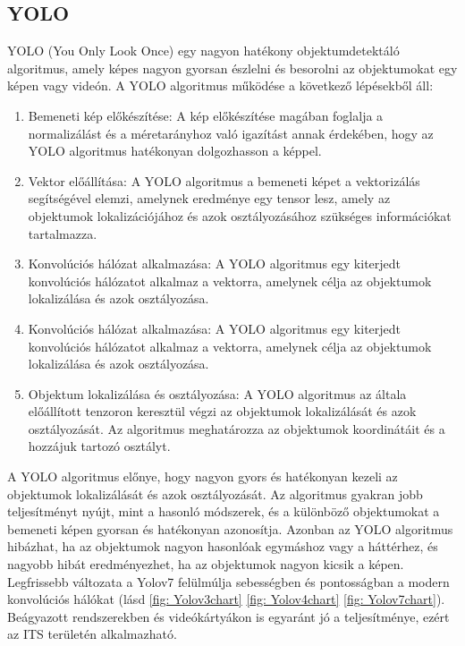 \documentclass[acmtog, authorversion]{acmart}
\begin{document}
\subsection{YOLO}
YOLO (You Only Look Once) egy nagyon hatékony objektumdetektáló algoritmus, amely képes nagyon gyorsan észlelni és besorolni az objektumokat egy képen vagy videón.
A YOLO algoritmus működése a következő lépésekből áll:
\begin{enumerate}
    \item Bemeneti kép előkészítése: A kép előkészítése magában foglalja a normalizálást és a méretarányhoz való igazítást annak érdekében, hogy az YOLO algoritmus hatékonyan dolgozhasson a képpel.
    \item Vektor előállítása: A YOLO algoritmus a bemeneti képet a vektorizálás segítségével elemzi, amelynek eredménye egy tensor lesz, amely az objektumok lokalizációjához és azok osztályozásához szükséges információkat tartalmazza.
    \item Konvolúciós hálózat alkalmazása: A YOLO algoritmus egy kiterjedt konvolúciós hálózatot alkalmaz a vektorra, amelynek célja az objektumok lokalizálása és azok osztályozása.
    \item Konvolúciós hálózat alkalmazása: A YOLO algoritmus egy kiterjedt konvolúciós hálózatot alkalmaz a vektorra, amelynek célja az objektumok lokalizálása és azok osztályozása.
    \item Objektum lokalizálása és osztályozása: A YOLO algoritmus az általa előállított tenzoron keresztül végzi az objektumok lokalizálását és azok osztályozását. Az algoritmus meghatározza az objektumok koordinátáit és a hozzájuk tartozó osztályt.
\end{enumerate}
A YOLO algoritmus előnye, hogy nagyon gyors és hatékonyan kezeli az objektumok lokalizálását és azok osztályozását. Az algoritmus gyakran jobb teljesítményt nyújt, mint a hasonló módszerek, és a különböző objektumokat a bemeneti képen gyorsan és hatékonyan azonosítja. Azonban az YOLO algoritmus hibázhat, ha az objektumok nagyon hasonlóak egymáshoz vagy a háttérhez, és nagyobb hibát eredményezhet, ha az objektumok nagyon kicsik a képen.
Legfrissebb változata a Yolov7 felülmúlja sebességben és pontosságban a modern konvolúciós hálókat (lásd \ref{fig: Yolov3chart} \ref{fig: Yolov4chart} \ref{fig: Yolov7chart}). Beágyazott rendszerekben és videókártyákon is egyaránt jó a teljesítménye, ezért az ITS területén alkalmazható. 
\end{document}
